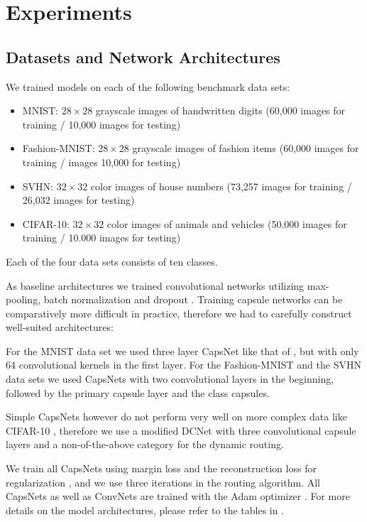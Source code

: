 
\section{Experiments}
\label{sec:experiments}

\subsection{Datasets and Network Architectures}

We trained models on each of the following benchmark data sets:

\begin{itemize}
	\item MNIST: $28\times28$ grayscale images of handwritten digits (60,000  images for training / 10,000  images for testing) \cite{mnist}
	\item Fashion-MNIST:  $28\times28$ grayscale images of fashion items (60,000 images for training / images 10,000 for testing) \cite{fashion}
	\item SVHN: $32\times32$ color images of house numbers (73,257  images for training / 26,032 images for testing) \cite{svhn}
	\item CIFAR-10: $32\times32$ color images of animals and vehicles (50.000  images for training / 10.000  images for testing) \cite{cifar}
\end{itemize}

Each of the four data sets consists of ten classes.

As baseline architectures we trained convolutional networks utilizing max-pooling, batch normalization \citep{batchnorm} and dropout \citep{dropout}.
Training capsule networks can be comparatively more difficult in practice, therefore we had to carefully construct well-suited architectures:

For the MNIST data set we used three layer CapsNet like that of \citet{capsules}, but with only 64 convolutional kernels in the first layer.
For the Fashion-MNIST and the SVHN data sets we used CapsNets with two convolutional layers in the beginning, followed by the primary capsule layer and the class capsules.

Simple CapsNets however do not perform very well on more complex data like \mbox{CIFAR-10} \citep{complex}, therefore we use a modified DCNet \citep{dcnet} with three convolutional capsule layers and a non-of-the-above category for the dynamic routing.

We train all CapsNets using margin loss and the reconstruction loss for regularization \citep{capsules}, and we use three iterations in the routing algorithm.
All CapsNets as well as ConvNets are trained with the Adam optimizer \citep{adam}.
For more details on the model architectures, please refer to the tables in .

